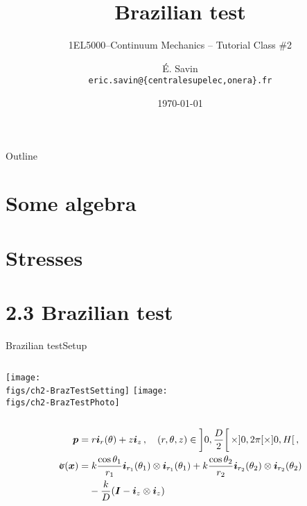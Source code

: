 \documentclass{beamer}
\title[1EL5000/S2]
{Brazilian test}
\subtitle{1EL5000--Continuum Mechanics -- Tutorial Class \#2} %
\author[\'E. Savin] %
{\'E. Savin\inst{1,2}\\ \scriptsize{\texttt{eric.savin@\{centralesupelec,onera\}.fr}}}%
\institute[Onera] %
{\inst{1}{Information Processing and Systems Dept.\\\Onera, France}
\and
 \inst{2}{Mechanical and Civil Engineering Dept.\\\ECP, France}}%
\date{\today}
\newcommand{\Id}{{\boldsymbol I}}
\newcommand{\xj}{x}
\newcommand{\zj}{z}
\newcommand{\xv}{{\boldsymbol\xj}}
\renewcommand{\ij}{i}
\newcommand{\pj}{p}
\newcommand{\iv}{{\boldsymbol\ij}}
\newcommand{\pv}{{\boldsymbol\pj}}
\newcommand*{\stress}{\mbox{$\hspace{0.3em}\rotatebox[x=0pt,y=0.2pt]{90}{\rule{0.017\linewidth}{0.4pt}}\hspace{-0.25em}\upsigma$}}
\begin{document}
\begin{frame}
  \titlepage
\end{frame}

\begin{frame}{Outline}
  \tableofcontents
\end{frame}




\section{Some algebra}



\section{Stresses}



\section{2.3 Brazilian test}

\begin{frame}{Brazilian test}{Setup}

\begin{columns}[t]
\centering\texttt{[image: \\figs/ch2-BrazTestSetting]}
\vskip-100pt
\centering\texttt{[image: \\figs/ch2-BrazTestPhoto]}
\end{columns}
\begin{displaymath}
\begin{split}
\pv= & \; r\iv_r(\theta)+\zj\iv_\zj\,,\quad(r,\theta,z)\in\left]0,\frac{D}{2}\right[\times]0,2\pi[\times]0,H[\,, \\
\stress(\xv)= & \; k\frac{\cos\theta_1}{r_1}\iv_{r_1}(\theta_1)\otimes\iv_{r_1}(\theta_1)+k\frac{\cos\theta_2}{r_2}\iv_{r_2}(\theta_2)\otimes\iv_{r_2}(\theta_2) \\
&-\frac{k}{D}(\Id-\iv_z\otimes\iv_z)
\end{split}
\end{displaymath}

\end{frame}
\end{document}
